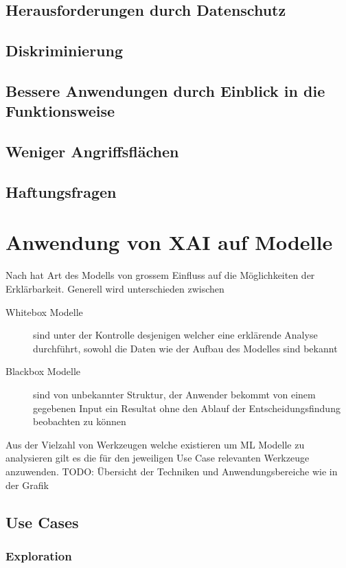 \documentclass[
  12pt, %
  a4paper, %
  oneside, %
  openany, 
  numbers=noenddot, %
  BCOR=5mm, %
  parskip=half*, %
  thesis, %
]{bfhbook}
\begin{document}
\section{Herausforderungen durch Datenschutz}

\section{Diskriminierung}

\section{Bessere Anwendungen durch Einblick in die Funktionsweise}

\section{Weniger Angriffsflächen}

\section{Haftungsfragen}

\chapter{Anwendung von XAI auf Modelle}
Nach \parencite{Oh2019} hat Art des Modells von grossem Einfluss auf die Möglichkeiten der Erklärbarkeit. Generell wird unterschieden zwischen
\begin{description}
\item [Whitebox Modelle] sind unter der Kontrolle desjenigen welcher eine erklärende Analyse durchführt, sowohl die Daten wie der Aufbau des Modelles sind bekannt
\item[Blackbox Modelle] sind von unbekannter Struktur, der Anwender bekommt von einem gegebenen Input ein Resultat ohne den Ablauf der Entscheidungsfindung beobachten zu können
\end{description}

Aus der Vielzahl von Werkzeugen welche existieren um \acrfull{ML} Modelle zu analysieren gilt es die für den jeweiligen Use Case relevanten Werkzeuge anzuwenden.
TODO: Übersicht der Techniken und Anwendungsbereiche wie in der Grafik

\section{Use Cases}
\subsection{Exploration}
\end{document}
